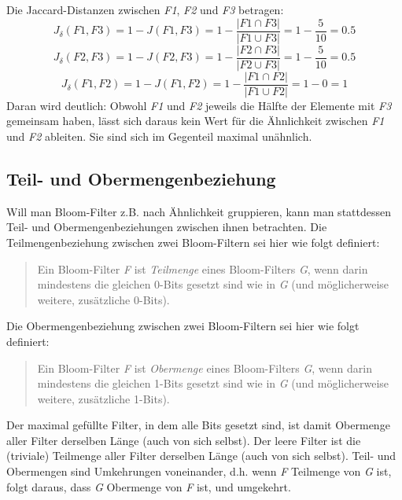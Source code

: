 \noindent
Die Jaccard-Distanzen zwischen \textit{F1}, \textit{F2} und \textit{F3} betragen: 
\[J_{\delta}(F1,F3) = 1 - J(F1,F3) = 1 - \frac{|F1\cap F3|}{|F1\cup F3|} = 1 - \frac{5}{10} = 0.5\]
\[J_{\delta}(F2,F3) = 1 - J(F2,F3) = 1 - \frac{|F2\cap F3|}{|F2\cup F3|} = 1 - \frac{5}{10} = 0.5\]
\[J_{\delta}(F1,F2) = 1 - J(F1,F2) = 1 - \frac{|F1\cap F2|}{|F1\cup F2|} = 1 - 0 = 1\]
Daran wird deutlich: Obwohl \textit{F1} und \textit{F2} jeweils die Hälfte der Elemente mit \textit{F3} gemeinsam haben, lässt sich daraus kein Wert für die Ähnlichkeit zwischen \textit{F1} und \textit{F2} ableiten. Sie sind sich im Gegenteil maximal unähnlich. 
\subsection{Teil- und Obermengenbeziehung}\label{sec:mengenbeziehungen}
Will man Bloom-Filter z.B. nach Ähnlichkeit gruppieren, kann man stattdessen Teil- und Obermengenbeziehungen zwischen ihnen betrachten. Die Teilmengenbeziehung zwischen zwei Bloom-Filtern sei hier wie folgt definiert: 
\begin{quote}
Ein Bloom-Filter \textit{F} ist \textit{Teilmenge} eines Bloom-Filters \textit{G}, wenn darin mindestens die gleichen 0-Bits gesetzt sind wie in \textit{G} (und möglicherweise weitere, zusätzliche 0-Bits).
\end{quote}
Die Obermengenbeziehung zwischen zwei Bloom-Filtern sei hier wie folgt definiert: 
\begin{quote}
Ein Bloom-Filter \textit{F} ist \textit{Obermenge} eines Bloom-Filters \textit{G}, wenn darin mindestens die gleichen 1-Bits gesetzt sind wie in \textit{G} (und möglicherweise weitere, zusätzliche 1-Bits).
\end{quote}
Der maximal gefüllte Filter, in dem alle Bits gesetzt sind, ist damit Obermenge aller Filter derselben Länge (auch von sich selbst). Der leere Filter ist die (triviale) Teilmenge aller Filter derselben Länge (auch von sich selbst). Teil- und Obermengen sind Umkehrungen voneinander, d.h. wenn \textit{F} Teilmenge von \textit{G} ist, folgt daraus, dass \textit{G} Obermenge von \textit{F} ist, und umgekehrt.  

